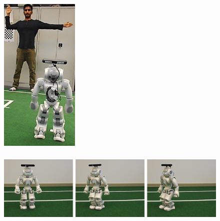 \begin{figure}
	[h] 
	\begin{minipage}
		{1 
		\textwidth} \centering 
		\includegraphics[height=75mm]{figures/result/res-ges-turn-left.png} \caption*{} 
	\end{minipage}
	\begin{minipage}
		{1 
		\textwidth} 
		\includegraphics[height=42mm]{figures/result/nao-gm-turn-left.png} 
	\end{minipage}
\end{figure}
